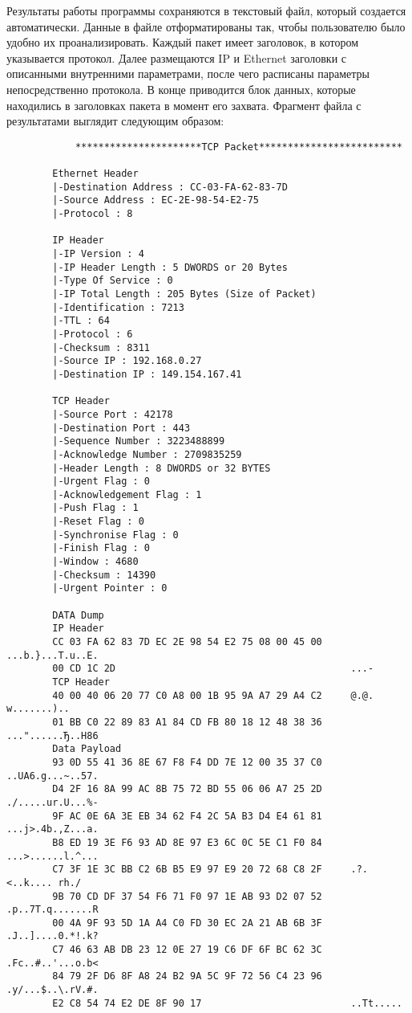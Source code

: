 Результаты работы программы сохраняются в текстовый файл, который
создается автоматически. Данные в файле отформатированы так, чтобы
пользователю было удобно их проанализировать. Каждый пакет имеет
заголовок, в котором указывается протокол. Далее размещаются IP и Ethernet
заголовки с описанными внутренними параметрами, после чего расписаны
параметры непосредственно протокола. В конце приводится блок данных,
которые находились в заголовках пакета в момент его захвата. Фрагмент файла
с результатами выглядит следующим образом:
\footnotesize
\begin{verbatim}
            **********************TCP Packet*************************

        Ethernet Header
        |-Destination Address : CC-03-FA-62-83-7D 
        |-Source Address : EC-2E-98-54-E2-75 
        |-Protocol : 8 

        IP Header
        |-IP Version : 4
        |-IP Header Length : 5 DWORDS or 20 Bytes
        |-Type Of Service : 0
        |-IP Total Length : 205 Bytes (Size of Packet)
        |-Identification : 7213
        |-TTL : 64
        |-Protocol : 6
        |-Checksum : 8311
        |-Source IP : 192.168.0.27
        |-Destination IP : 149.154.167.41

        TCP Header
        |-Source Port : 42178
        |-Destination Port : 443
        |-Sequence Number : 3223488899
        |-Acknowledge Number : 2709835259
        |-Header Length : 8 DWORDS or 32 BYTES
        |-Urgent Flag : 0
        |-Acknowledgement Flag : 1
        |-Push Flag : 1
        |-Reset Flag : 0
        |-Synchronise Flag : 0
        |-Finish Flag : 0
        |-Window : 4680
        |-Checksum : 14390
        |-Urgent Pointer : 0

        DATA Dump 
        IP Header
        CC 03 FA 62 83 7D EC 2E 98 54 E2 75 08 00 45 00 	...b.}...T.u..E.
        00 CD 1C 2D                                     	...-
        TCP Header
        40 00 40 06 20 77 C0 A8 00 1B 95 9A A7 29 A4 C2 	@.@. w.......)..
        01 BB C0 22 89 83 A1 84 CD FB 80 18 12 48 38 36 	..."......Ђ..H86
        Data Payload
        93 0D 55 41 36 8E 67 F8 F4 DD 7E 12 00 35 37 C0 	..UA6.g...~..57.
        D4 2F 16 8A 99 AC 8B 75 72 BD 55 06 06 A7 25 2D 	./.....ur.U...%-
        9F AC 0E 6A 3E EB 34 62 F4 2C 5A B3 D4 E4 61 81 	...j>.4b.,Z...a.
        B8 ED 19 3E F6 93 AD 8E 97 E3 6C 0C 5E C1 F0 84 	...>......l.^...
        C7 3F 1E 3C BB C2 6B B5 E9 97 E9 20 72 68 C8 2F 	.?.<..k.... rh./
        9B 70 CD DF 37 54 F6 71 F0 97 1E AB 93 D2 07 52 	.p..7T.q.......R
        00 4A 9F 93 5D 1A A4 C0 FD 30 EC 2A 21 AB 6B 3F 	.J..]....0.*!.k?
        C7 46 63 AB DB 23 12 0E 27 19 C6 DF 6F BC 62 3C 	.Fc..#..'...o.b<
        84 79 2F D6 8F A8 24 B2 9A 5C 9F 72 56 C4 23 96 	.y/...$..\.rV.#.
        E2 C8 54 74 E2 DE 8F 90 17                      	..Tt.....        
\end{verbatim}
\normalsize



